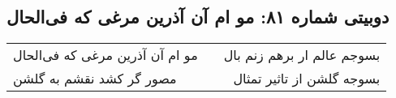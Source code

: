 \begin{center}
\section*{دوبیتی شماره ۸۱: مو ام آن آذرین مرغی که فی‌الحال}
\label{sec:081}
\begin{longtable}{l p{0.5cm} r}
مو ام آن آذرین مرغی که فی‌الحال
&&
بسوجم عالم ار برهم زنم بال
\\
مصور گر کشد نقشم به گلشن
&&
بسوجه گلشن از تاثیر تمثال
\\
\end{longtable}
\end{center}
